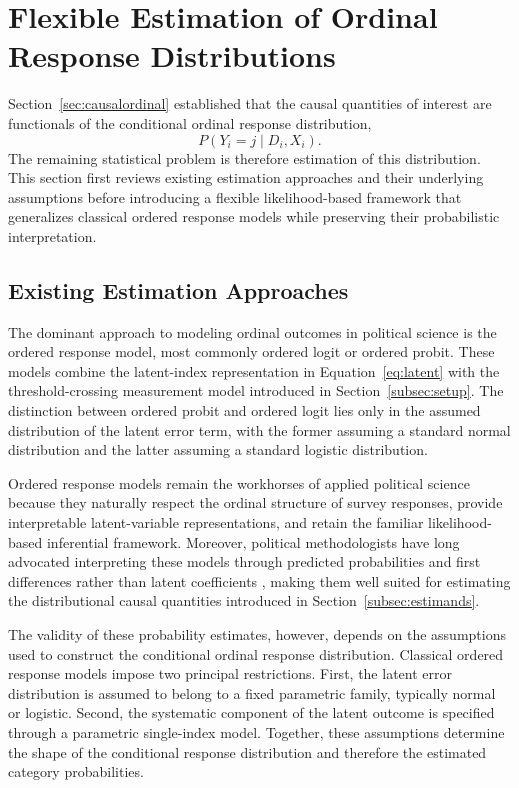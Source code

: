 \documentclass{article}
\begin{document}
\section{Flexible Estimation of Ordinal Response Distributions}
\label{sec:estimation}

Section~\ref{sec:causalordinal} established that the causal quantities of interest are functionals of the conditional ordinal response distribution,
\[
P(Y_i=j\mid D_i,X_i).
\]
The remaining statistical problem is therefore estimation of this distribution. This section first reviews existing estimation approaches and their underlying assumptions before introducing a flexible likelihood-based framework that generalizes classical ordered response models while preserving their probabilistic interpretation.

\subsection{Existing Estimation Approaches}
\label{subsec:existing}

The dominant approach to modeling ordinal outcomes in political science is the ordered response model, most commonly ordered logit or ordered probit. These models combine the latent-index representation in Equation~\eqref{eq:latent} with the threshold-crossing measurement model introduced in Section~\ref{subsec:setup}. The distinction between ordered probit and ordered logit lies only in the assumed distribution of the latent error term, with the former assuming a standard normal distribution and the latter assuming a standard logistic distribution.

Ordered response models remain the workhorses of applied political science because they naturally respect the ordinal structure of survey responses, provide interpretable latent-variable representations, and retain the familiar likelihood-based inferential framework. Moreover, political methodologists have long advocated interpreting these models through predicted probabilities and first differences rather than latent coefficients \citep{Hanmer2013a}, making them well suited for estimating the distributional causal quantities introduced in Section~\ref{subsec:estimands}.

The validity of these probability estimates, however, depends on the assumptions used to construct the conditional ordinal response distribution. Classical ordered response models impose two principal restrictions. First, the latent error distribution is assumed to belong to a fixed parametric family, typically normal or logistic. Second, the systematic component of the latent outcome is specified through a parametric single-index model. Together, these assumptions determine the shape of the conditional response distribution and therefore the estimated category probabilities.
\end{document}
